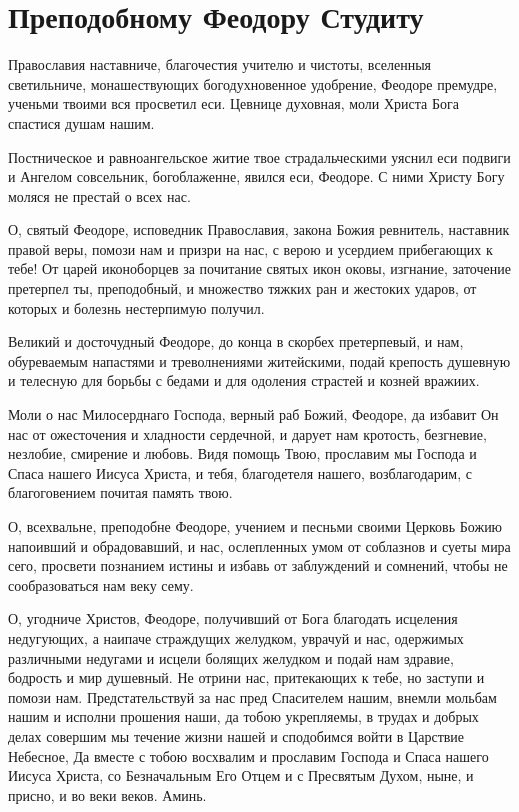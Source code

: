 \section{Преподобному Феодору Студиту}\begin{mymulticols}


Православия наставниче, благочестия учителю и чистоты, вселенныя светильниче, монашествующих богодухновенное удобрение, Феодоре премудре, ученьми твоими вся просветил еси. Цевнице духовная, моли Христа Бога спастися душам нашим.


Постническое и равноангельское житие твое страдальческими уяснил еси подвиги и Ангелом совсельник, богоблаженне, явился еси, Феодоре. С ними Христу Богу моляся не престай о всех нас. 


О, святый Феодоре, исповедник Православия, закона Божия ревнитель, наставник правой веры, помози нам и призри на нас, с верою и усердием прибегающих к тебе! От царей иконоборцев за почитание святых икон оковы, изгнание, заточение претерпел ты, преподобный, и множество тяжких ран и жестоких ударов, от которых и болезнь нестерпимую получил. 

Великий и досточудный Феодоре, до конца в скорбех претерпевый, и нам, обуреваемым напастями и треволнениями житейскими, подай крепость душевную и телесную для борьбы с бедами и для одоления страстей и козней вражиих. 

Моли о нас Милосерднаго Господа, верный раб Божий, Феодоре, да избавит Он нас от ожесточения и хладности сердечной, и дарует нам кротость, безгневие, незлобие, смирение и любовь. Видя помощь Твою, прославим мы Господа и Спаса нашего Иисуса Христа, и тебя, благодетеля нашего, возблагодарим, с благоговением почитая память твою. 

О, всехвальне, преподобне Феодоре, учением и песньми своими Церковь Божию напоивший и обрадовавший, и нас, ослепленных умом от соблазнов и суеты мира сего, просвети познанием истины и избавь от заблуждений и сомнений, чтобы не сообразоваться нам веку сему. 

О, угодниче Христов, Феодоре, получивший от Бога благодать исцеления недугующих, а наипаче страждущих желудком, уврачуй и нас, одержимых различными недугами и исцели болящих желудком и подай нам здравие, бодрость и мир душевный. Не отрини нас, притекающих к тебе, но заступи и помози нам. Предстательствуй за нас пред Спасителем нашим, внемли мольбам нашим и исполни прошения наши, да тобою укрепляемы, в трудах и добрых делах совершим мы течение жизни нашей и сподобимся войти в Царствие Небесное, Да вместе с тобою восхвалим и прославим Господа и Спаса нашего Иисуса Христа, со Безначальным Его Отцем и с Пресвятым Духом, ныне, и присно, и во веки веков. Аминь.

\end{mymulticols}

